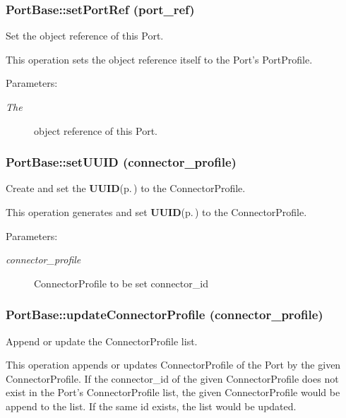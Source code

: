 \subsubsection{\setlength{\rightskip}{0pt plus 5cm}Port\-Base::set\-Port\-Ref (port\_\-ref)}\label{classPortBase_PortBasea12}


Set the object reference of this Port. 

This operation sets the object reference itself to the Port's Port\-Profile.

\begin{Desc}
\item[Parameters:]
\begin{description}
\item[{\em The}]object reference of this Port.\end{description}
\end{Desc}
\subsubsection{\setlength{\rightskip}{0pt plus 5cm}Port\-Base::set\-UUID (connector\_\-profile)}\label{classPortBase_PortBasea19}


Create and set the {\bf UUID}{\rm (p.\,\pageref{classUUID})} to the Connector\-Profile. 

This operation generates and set {\bf UUID}{\rm (p.\,\pageref{classUUID})} to the Connector\-Profile.

\begin{Desc}
\item[Parameters:]
\begin{description}
\item[{\em connector\_\-profile}]Connector\-Profile to be set connector\_\-id\end{description}
\end{Desc}
\subsubsection{\setlength{\rightskip}{0pt plus 5cm}Port\-Base::update\-Connector\-Profile (connector\_\-profile)}\label{classPortBase_PortBasea23}


Append or update the Connector\-Profile list. 

This operation appends or updates Connector\-Profile of the Port by the given Connector\-Profile. If the connector\_\-id of the given Connector\-Profile does not exist in the Port's Connector\-Profile list, the given Connector\-Profile would be append to the list. If the same id exists, the list would be updated.

